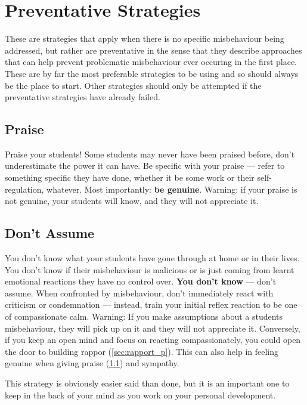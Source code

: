 \documentclass[12pt]{report}
\begin{document}
\chapter{Preventative Strategies}
\label{chap:preventative}

These are strategies that apply when there is no specific misbehaviour being addressed, but rather are preventative in the sense that they describe approaches that can help prevent problematic misbehaviour ever occuring in the first place. These are by far the most preferable strategies to be using and so should always be the place to start. Other strategies should only be attempted if the preventative strategies have already failed. 



\section{Praise}
\label{sec:praise_p}

Praise your students! Some students may never have been praised before, don't underestimate the power it can have. Be specific with your praise --- refer to something specific they have done, whether it be some work or their self-regulation, whatever. Most importantly: \textbf{be genuine}. Warning: if your praise is not genuine, your students will know, and they will not appreciate it.



\section{Don't Assume}
\label{sec:dont_assume_p}

You don't know what your students have gone through at home or in their lives. You don't know if their misbehaviour is malicious or is just coming from learnt emotional reactions they have no control over. \textbf{You don't know} --- don't assume. When confronted by misbehaviour, don't immediately react with criticism or condemnation --- instead, train your initial reflex reaction to be one of compassionate calm. Warning: If you make assumptions about a students misbehaviour, they will pick up on it and they will not appreciate it. Conversely, if you keep an open mind and focus on reacting compassionately, you could open the door to building rappor (\ref{sec:rapport_p}). This can also help in feeling genuine when giving praise (\ref{sec:praise_p}) and sympathy.

This strategy is obviously easier said than done, but it is an important one to keep in the back of your mind as you work on your personal development.
\end{document}
